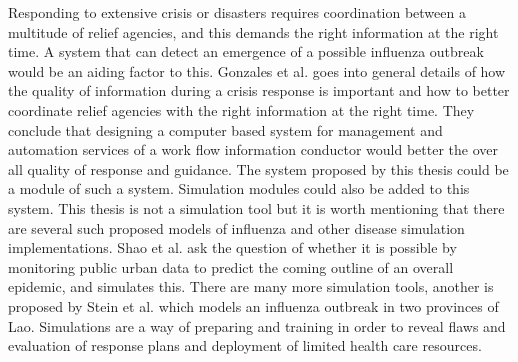 Responding to extensive crisis or disasters requires coordination between a multitude of relief agencies, and this demands the right information at the right time. A system that can detect an emergence of a possible influenza outbreak would be an aiding factor to this. Gonzales et al. \cite{gonzalez2009framework} goes into general details of how the quality of information during a crisis response is important and how to better coordinate relief agencies with the right information at the right time. They conclude that designing a computer based system for management and automation services of a work flow information conductor would better the over all quality of response and guidance. The system proposed by this thesis could be a module of such a system. Simulation modules could also be added to this system. This thesis is not a simulation tool but it is worth mentioning that there are several such proposed models of influenza and other disease simulation implementations. Shao et al. \cite{shao2016forecasting} ask the question of whether it is possible by monitoring public urban data to predict the coming outline of an overall epidemic, and simulates this. There are many more simulation tools, another is proposed by Stein et al. \cite{stein2012development} which models an influenza outbreak in two provinces of Lao. Simulations are a way of preparing and training in order to reveal flaws and evaluation of response plans and deployment of limited health care resources.

